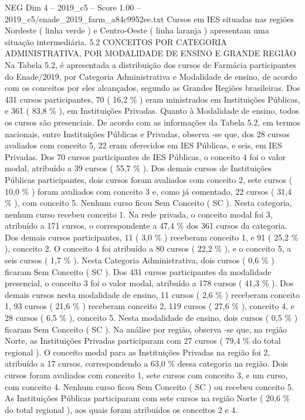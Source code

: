 \begin{textsample}{NEG Dim 4 – 2019\_c5 – Score 1.00 – 2019\_c5/enade\_2019\_farm\_a84c9952ee.txt}
Cursos em IES situadas nas regiões Nordeste ( linha verde ) e Centro-Oeste ( linha laranja ) apresentam uma situação intermediária. 5.2 CONCEITOS POR CATEGORIA ADMINISTRATIVA, POR MODALIDADE DE ENSINO E GRANDE REGIÃO Na Tabela 5.2, é apresentada a distribuição dos cursos de Farmácia participantes do Enade/2019, por Categoria Administrativa e Modalidade de ensino, de acordo com os conceitos por eles alcançados, segundo as Grandes Regiões brasileiras.
Dos 431 cursos participantes, 70 ( 16,2 \% ) eram ministrados em Instituições Públicas, e 361 ( 83,8 \% ), em Instituições Privadas.
Quanto à Modalidade de ensino, todos os cursos são presenciais.
De acordo com as informações da Tabela 5.2, em termos nacionais, entre Instituições Públicas e Privadas, observa -se que, dos 28 cursos avaliados com conceito 5, 22 eram oferecidos em IES Públicas, e seis, em IES Privadas.
Dos 70 cursos participantes de IES Públicas, o conceito 4 foi o valor modal, atribuído a 39 cursos ( 55,7 \% ).
Dos demais cursos de Instituições Públicas participantes, dois cursos foram avaliados com conceito 2, sete cursos ( 10,0 \% ) foram avaliados com conceito 3 e, como já comentado, 22 cursos ( 31,4 \% ), com conceito 5.
Nenhum curso ficou Sem Conceito ( SC ).
Nesta categoria, nenhum curso recebeu conceito 1.
Na rede privada, o conceito modal foi 3, atribuído a 171 cursos, o correspondente a 47,4 \% dos 361 cursos da categoria.
Dos demais cursos participantes, 11 ( 3,0 \% ) receberam conceito 1, e 91 ( 25,2 \% ), conceito 2.
O conceito 4 foi atribuído a 80 cursos ( 22,2 \% ), e o conceito 5, a seis cursos ( 1,7 \% ).
Nesta Categoria Administrativa, dois cursos ( 0,6 \% ) ficaram Sem Conceito ( SC ).
Dos 431 cursos participantes da modalidade presencial, o conceito 3 foi o valor modal, atribuído a 178 cursos ( 41,3 \% ).
Dos demais cursos nesta modalidade de ensino, 11 cursos ( 2,6 \% ) receberam conceito 1, 93 cursos ( 21,6 \% ) receberam conceito 2, 119 cursos ( 27,6 \% ), conceito 4, e 28 cursos ( 6,5 \% ), conceito 5.
Nesta modalidade de ensino, dois cursos ( 0,5 \% ) ficaram Sem Conceito ( SC ).
Na análise por região, observa -se que, na região Norte, as Instituições Privadas participaram com 27 cursos ( 79,4 \% do total regional ).
O conceito modal para as Instituições Privadas na região foi 2, atribuído a 17 cursos, correspondendo a 63,0 \% dessa categoria na região.
Dois cursos foram avaliados com conceito 1, sete cursos com conceito 3, e um curso, com conceito 4.
Nenhum curso ficou Sem Conceito ( SC ) ou recebeu conceito 5.
As Instituições Públicas participaram com sete cursos na região Norte ( 20,6 \% do total regional ), aos quais foram atribuídos os conceitos 2 e 4.

\end{textsample}
